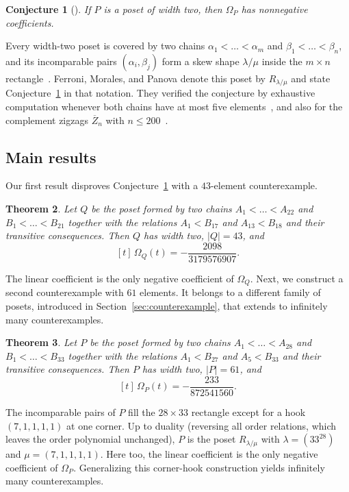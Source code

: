 \documentclass[11pt]{amsart}
\newtheorem{theorem}{Theorem}[section]
\newtheorem{conjecture}[theorem]{Conjecture}
\theoremstyle{remark}
\numberwithin{equation}{section}
\begin{document}
\begin{conjecture}[{\cite[Conjecture~7.1]{FMP}}]\label{conj:FMP}
If $P$ is a poset of width two, then $\Omega_P$ has nonnegative coefficients.
\end{conjecture}

Every width-two poset is covered by two chains $\alpha_1<\dots<\alpha_m$ and
$\beta_1<\dots<\beta_n$, and its incomparable pairs $(\alpha_i,\beta_j)$ form a
skew shape $\lambda/\mu$ inside the $m\times n$
rectangle~\cite[Section~8]{CPP}. Ferroni, Morales, and Panova denote this poset
by $R_{\lambda/\mu}$ and state Conjecture~\ref{conj:FMP} in that notation.
They verified the conjecture by exhaustive computation whenever both chains have
at most five elements~\cite[Section~7.1]{FMP}, and also for the complement
zigzags $\overline Z_n$ with $n\le200$~\cite[Remark~7.3]{FMP}.

\subsection*{Main results}
Our first result disproves Conjecture~\ref{conj:FMP} with a $43$-element
counterexample.

\begin{theorem}\label{thm:small}
Let $Q$ be the poset formed by two chains $A_1<\dots<A_{22}$ and
$B_1<\dots<B_{21}$ together with the relations $A_1<B_{17}$ and $A_{13}<B_{18}$
and their transitive consequences. Then $Q$ has width two, $|Q|=43$, and
\[
 [t]\,\Omega_Q(t)=-\frac{2098}{3179576907}.
\]
\end{theorem}

The linear coefficient is the only negative coefficient of $\Omega_Q$. Next, we
construct a second counterexample with $61$ elements. It belongs to a different
family of posets, introduced in Section~\ref{sec:counterexample}, that extends
to infinitely many counterexamples.

\begin{theorem}\label{thm:main}
Let $P$ be the poset formed by two chains $A_1<\dots<A_{28}$ and
$B_1<\dots<B_{33}$ together with the relations $A_1<B_{27}$ and $A_5<B_{33}$ and
their transitive consequences. Then $P$ has width two, $|P|=61$, and
\[
 [t]\,\Omega_P(t)=-\frac{233}{872541560}.
\]
\end{theorem}

The incomparable pairs of $P$ fill the $28\times33$ rectangle except for a
hook $(7,1,1,1,1)$ at one corner. Up to duality (reversing all order relations,
which leaves the order polynomial unchanged), $P$ is the poset $R_{\lambda/\mu}$
with $\lambda=(33^{28})$ and $\mu=(7,1,1,1,1)$. Here too, the linear
coefficient is the only negative coefficient of $\Omega_P$. Generalizing this
corner-hook construction yields infinitely many counterexamples.
\end{document}
